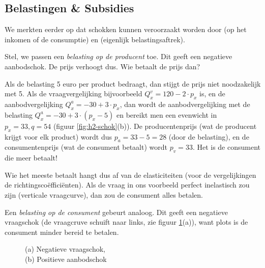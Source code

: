 \subsection{Belastingen \& Subsidies}

We merkten eerder op dat schokken kunnen veroorzaakt worden door  (op het inkomen of de consumptie) en  (eigenlijk belastingsaftrek).\\

\par Stel, we passen een \textit{belasting op de producent} toe. Dit geeft een negatieve aanbodschok. De prijs verhoogt dus. Wie betaalt de prijs dan?
\par Als de belasting 5 euro per product bedraagt, dan stijgt de prijs niet noodzakelijk met 5. Als de vraagvergelijking bijvoorbeeld $Q_x^v=120-2\cdot p_x$ is, en de aanbodvergelijking $Q_x^a=-30+3\cdot p_x$, dan wordt de aanbodvergelijking met de belasting $Q_x^a=-30+3\cdot(p_x-5)$ en bereikt men een evenwicht in $p_x=33,q=54$ (figuur \ref{fig:h2-schok}(b)). De producentenprijs (wat de producent krijgt voor elk product) wordt dus $p_a=33-5=28$ (door de belasting), en de consumentenprijs (wat de consument betaalt) wordt $p_v=33$. Het is de consument die meer betaalt! 
\par Wie het meeste betaalt hangt dus af van de elasticiteiten (voor de vergelijkingen de richtingsco\"effici\"enten). Als de vraag in ons voorbeeld perfect inelastisch zou zijn (verticale vraagcurve), dan zou de consument alles betalen.\\

\par Een \textit{belasting op de consument} gebeurt analoog. Dit geeft een negatieve vraagschok (de vraagcruve schuift naar links, zie figuur \ref{fig:h2-schok2}(a)), want plots is de consument minder bereid te betalen.

\begin{figure}[H]
\centering
\captionsetup{justification=centering,margin=2cm}
\caption{(a) Negatieve vraagschok, \\(b) Positieve aanbodschok}
\label{fig:h2-schok2}
\end{figure}

